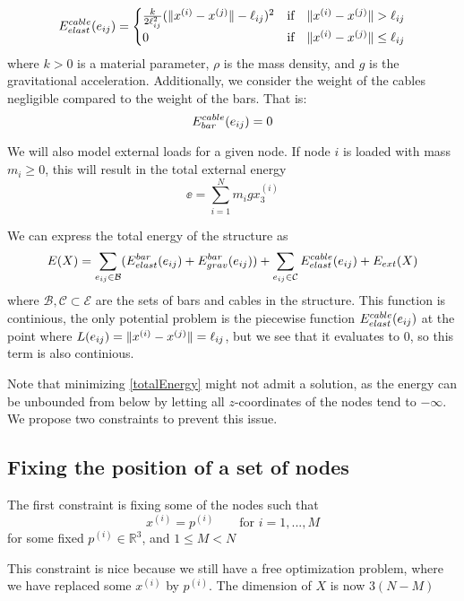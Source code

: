 \begin{equation}
E^{cable}_{elast}(e_{ij}) = \begin{cases}
    \frac{k}{2\ell_{ij}^2}(\lVert x^{(i)} - x^{(j)}\rVert-\ell_{ij})^2 & \text{if} \quad \lVert x^{(i)} - x^{(j)}\rVert >\ell_{ij}\\
    0 & \text{if} \quad \lVert x^{(i)} - x^{(j)}\rVert \leq \ell_{ij}
    \end{cases}
    \label{cableElast}
\end{equation}
where $k > 0$ is a material parameter, $\rho$ is the mass density, and $g$ is the gravitational acceleration. Additionally, we consider the weight of the cables negligible compared to the weight of the bars. That is:
\begin{equation}
    E^{cable}_{bar}(e_{ij}) = 0
    \label{cableGrav}
\end{equation}

We will also model external loads for a given node. If node $i$ is loaded with mass $m_i \geq 0$, this will result in the total external energy
\begin{equation}
    \ee = \sum_{i=1}^{N} m_i g x_3^{(i)}
    \label{externalEnergy}
\end{equation}

We can express the total energy of the structure as \begin{equation}
    E(X) = \sum\limits_{e_{ij} \in \mathcal{B}}(E^{bar}_{elast}(e_{ij}) + E^{bar}_{grav}(e_{ij})) + \sum\limits_{e_{ij} \in \mathcal{C}} E^{cable}_{elast}(e_{ij}) + E_{ext}(X)
    \label{totalEnergy}
\end{equation} where $\mathcal{B}, \mathcal{C} \subset \mathcal{E}$ are the sets of bars and cables in the structure. This function is continious, the only potential problem is the piecewise function $E^{cable}_{elast}(e_{ij})$ at the point where $L(e_{ij}) = \lVert x^{(i)} - x^{(j)}\rVert = \ell_{ij}$, but we see that it evaluates to $0$, so this term is also continious.

Note that minimizing \eqref{totalEnergy} might not admit a solution, as the energy can be unbounded from below by letting all $z$-coordinates of the nodes tend to $-\infty$. We propose two constraints to prevent this issue.

\subsection{Fixing the position of a set of nodes}
The first constraint is fixing some of the nodes such that
\begin{equation}
    x^{(i)} = p^{(i)} \qquad \text{for } i = 1,...,M
\end{equation} for some fixed $p^{(i)} \in \mathbb{R}^3$, and $1\leq M < N$

This constraint is nice because we still have a free optimization problem, where we have replaced some $x^{(i)}$ by $p^{(i)}$. The dimension of $X$ is now $3(N-M)$

